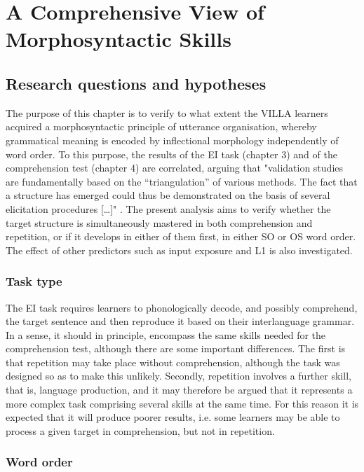 \chapter{A Comprehensive View of Morphosyntactic Skills}

\section{Research questions and hypotheses}\label{sec:06:1}

The purpose of this chapter is to verify to what extent the VILLA learners acquired a morphosyntactic principle of utterance organisation, whereby grammatical meaning is encoded by inflectional morphology independently of word order. To this purpose, the results of the EI task (chapter 3) and of the comprehension test (chapter 4) are correlated, arguing that "validation studies are fundamentally based on the “triangulation” of various methods. The fact that a structure has emerged could thus be demonstrated on the basis of several elicitation procedures […]" \citep[326]{Pallotti2006}. The present analysis aims to verify whether the target structure is simultaneously mastered in both comprehension and repetition, or if it develops in either of them first, in either SO or OS word order. The effect of other predictors such as input exposure and L1 is also investigated.

\subsection{Task type}\label{sec:06:1.1}

The EI task requires learners to phonologically decode, and possibly comprehend, the target sentence and then reproduce it based on their interlanguage grammar. In a sense, it should in principle, encompass the same skills needed for the comprehension test, although there are some important differences. The first is that repetition may take place without comprehension, although the task was designed so as to make this unlikely. Secondly, repetition involves a further skill, that is, language production, and it may therefore be argued that it represents a more complex task comprising several skills at the same time. For this reason it is expected that it will produce poorer results, i.e. some learners may be able to process a given target in comprehension, but not in repetition.

\subsection{Word order}\label{sec:06:1.2}

